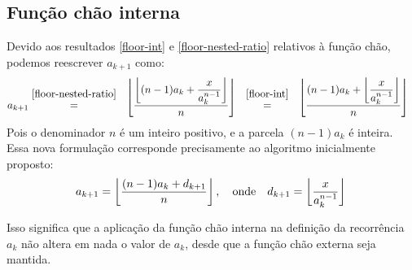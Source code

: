 \subsection*{Função chão interna}

Devido aos resultados \eqref{floor-int} e \eqref{floor-nested-ratio}
relativos à função chão,
podemos reescrever $a_{k+1}$ como:
\begin{equation}
    a_{k+1}
  \stackfirst{\eqref{floor-nested-ratio}}{=}
    \bracketize[.75em]{\lfloor}{\rfloor}{
      \dfrac{\left\lfloor
               (n-1) a_k + \dfrac{x}{a_k^{n-1}}
             \right\rfloor}
            {n}
    }
  \stackfirst{\eqref{floor-int}}{=}
    \bracketize[.75em]{\lfloor}{\rfloor}{
      \dfrac{(n-1) a_k +
             \left\lfloor \dfrac{x}{a_k^{n-1}} \right\rfloor}
            {n}
    }
\end{equation}
Pois o denominador $n$ é um inteiro positivo,
e a parcela $(n - 1) a_k$ é inteira.
Essa nova formulação corresponde precisamente
ao algoritmo inicialmente proposto:
\[
  a_{k+1} = \left\lfloor \dfrac{(n-1) a_k + d_{k+1}}{n} \right\rfloor,
  \quad\text{onde}\quad
  d_{k+1} = \left\lfloor \dfrac{x}{a_k^{n-1}} \right\rfloor \\
\]

Isso significa que a aplicação da função chão interna
na definição da recorrência $a_k$ não altera em nada o valor de $a_k$,
desde que a função chão externa seja mantida.
